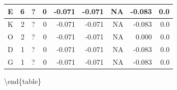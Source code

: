 \documentclass[
  letterpaper,
  DIV=11,
  numbers=noendperiod]{scrreprt}
\begin{document}
\begin{tabular}[t]{l|r|l|r|r|r|r|r|r}
\hline
\hspace{1em}E & 6 & ? & 0 & -0.071 & -0.071 & NA & -0.083 & 0.0\\
\hline
\hspace{1em}K & 2 & ? & 0 & -0.071 & -0.071 & NA & -0.083 & 0.0\\
\hline
\hspace{1em}O & 2 & ? & 0 & -0.071 & -0.071 & NA & 0.000 & 0.0\\
\hline
\hspace{1em}D & 1 & ? & 0 & -0.071 & -0.071 & NA & -0.083 & 0.0\\
\hline
\hspace{1em}G & 1 & ? & 0 & -0.071 & -0.071 & NA & -0.083 & 0.0\\
\hline
\end{tabular}

\textbackslash end\{table\}
\end{document}
